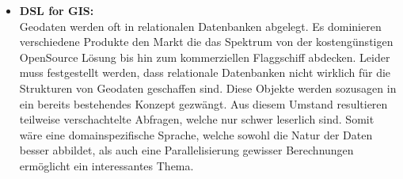 \documentclass{article}
\begin{document}
\begin{itemize}
	\item{\textbf{DSL for GIS: } \\
	Geodaten werden oft in relationalen Datenbanken abgelegt. Es dominieren verschiedene Produkte den Markt die das Spektrum von der kostengünstigen OpenSource Lösung bis hin zum kommerziellen Flaggschiff abdecken. Leider muss festgestellt werden, dass relationale Datenbanken nicht wirklich für die Strukturen von Geodaten geschaffen sind. Diese Objekte werden sozusagen in ein bereits bestehendes Konzept gezwängt. Aus diesem Umstand resultieren teilweise verschachtelte Abfragen, welche nur schwer leserlich sind. Somit wäre eine domainspezifische Sprache, welche sowohl die Natur der Daten besser abbildet, als auch eine Parallelisierung gewisser Berechnungen ermöglicht ein interessantes Thema.
	}

\end{itemize}
\end{document}
